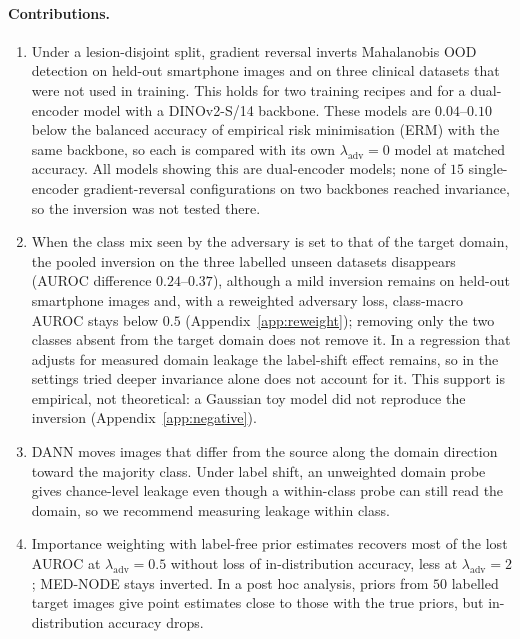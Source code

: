 \documentclass{midl}
\newcommand{\lam}{\lambda_{\mathrm{adv}}}
\begin{document}
\paragraph{Contributions.}
\begin{enumerate}
\item Under a lesion-disjoint split, gradient reversal inverts Mahalanobis OOD detection on
held-out smartphone images and on three clinical datasets that were not used in training.
This holds for two training
recipes and for a dual-encoder model with a DINOv2-S/14 backbone. These models are $0.04$--$0.10$ below the balanced accuracy of empirical risk minimisation (ERM) with the same backbone, so each is compared with its own $\lam=0$ model at matched accuracy. All models showing this are dual-encoder models; none of $15$ single-encoder gradient-reversal configurations on two backbones reached invariance, so the inversion was not tested there.
\item When the class mix seen by the adversary is set to that of the target domain, the
pooled inversion on the three labelled unseen datasets disappears (AUROC difference $0.24$--$0.37$), although a mild inversion remains on held-out smartphone images and, with a reweighted adversary loss, class-macro AUROC stays below $0.5$ (Appendix~\ref{app:reweight}); removing only the two classes absent from the target domain does not remove it. In a regression
that adjusts for measured domain leakage the label-shift effect remains, so in the settings tried deeper invariance
alone does not account for it. This support is empirical, not theoretical: a Gaussian toy model did not reproduce the inversion (Appendix~\ref{app:negative}).
\item DANN moves images that differ from the source along the domain direction toward the
majority class. Under label shift, an unweighted domain probe gives chance-level leakage
even though a within-class probe can still read the domain, so we recommend measuring
leakage within class.
\item Importance weighting with label-free prior estimates recovers most of the lost AUROC at
$\lam=0.5$ without loss of in-distribution accuracy, less at $\lam=2$; MED-NODE stays inverted. In a post hoc analysis, priors from $50$ labelled target images give point estimates close to
those with the true priors, but in-distribution accuracy drops.
\end{enumerate}
\end{document}
